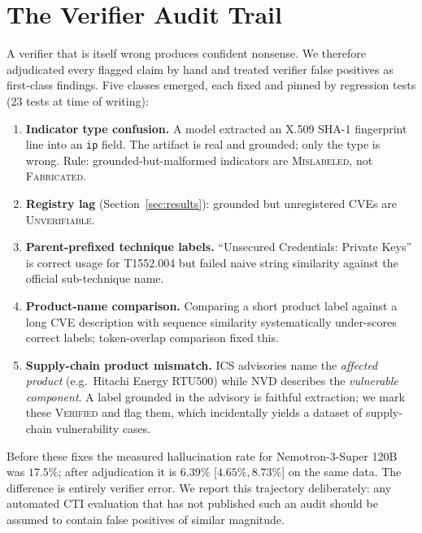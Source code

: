 \documentclass[10pt,twocolumn]{article}
\begin{document}
\section{The Verifier Audit Trail}
\label{sec:audit}

A verifier that is itself wrong produces confident nonsense. We therefore
adjudicated every flagged claim by hand and treated verifier false positives as
first-class findings. Five classes emerged, each fixed and pinned by regression
tests (23 tests at time of writing):

\begin{enumerate}\itemsep2pt
\item \textbf{Indicator type confusion.} A model extracted an X.509 SHA-1
      fingerprint line into an \texttt{ip} field. The artifact is real and
      grounded; only the type is wrong. Rule: grounded-but-malformed indicators
      are \textsc{Mislabeled}, not \textsc{Fabricated}.
\item \textbf{Registry lag} (Section~\ref{sec:results}): grounded but
      unregistered CVEs are \textsc{Unverifiable}.
\item \textbf{Parent-prefixed technique labels.} ``Unsecured Credentials:
      Private Keys'' is correct usage for T1552.004 but failed naive string
      similarity against the official sub-technique name.
\item \textbf{Product-name comparison.} Comparing a short product label against
      a long CVE description with sequence similarity systematically
      under-scores correct labels; token-overlap comparison fixed this.
\item \textbf{Supply-chain product mismatch.} ICS advisories name the
      \emph{affected product} (e.g.\ Hitachi Energy RTU500) while NVD describes
      the \emph{vulnerable component}. A label grounded in the advisory is
      faithful extraction; we mark these \textsc{Verified} and flag them, which
      incidentally yields a dataset of supply-chain vulnerability cases.
\end{enumerate}

Before these fixes the measured hallucination rate for Nemotron-3-Super 120B was
$17.5\%$; after adjudication it is $6.39\%$ [$4.65\%, 8.73\%$] on the same data. The difference is
entirely verifier error. We report this trajectory deliberately: any automated
CTI evaluation that has not published such an audit should be assumed to
contain false positives of similar magnitude.
\end{document}
